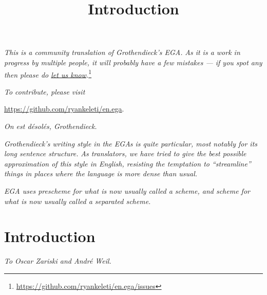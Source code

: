 


\title{Introduction}
\maketitle

\label{section-what-this-is}

\noindent
\emph{This is a community translation of Grothendieck's EGA.}
\emph{As it is a work in progress by multiple people, it will probably have a few mistakes --- if you spot any then please do \href{https://github.com/ryankeleti/en.ega/issues}{let us know}.}\footnote{\url{https://github.com/ryankeleti/en.ega/issues}}

\emph{To contribute, please visit}
\begin{center}
    \url{https://github.com/ryankeleti/en.ega}.
\end{center}

\emph{On est d\'esol\'es, Grothendieck.}


\noindent
\emph{Grothendieck's writing style in the EGAs is quite particular, most notably for its long sentence structure.}
\emph{As translators, we have tried to give the best possible approximation of this style in English, resisting the temptation to ``streamline'' things in places where the language is more dense than usual.}


\noindent
\emph{EGA uses {\em prescheme} for what is now usually called a scheme, and {\em scheme} for what is now usually called a separated scheme.}

\tableofcontents{}

\section*{Introduction}
\label{section-intro}

\begin{flushright}
{\em To Oscar Zariski and Andr\'e Weil.}
\end{flushright}
\medskip

